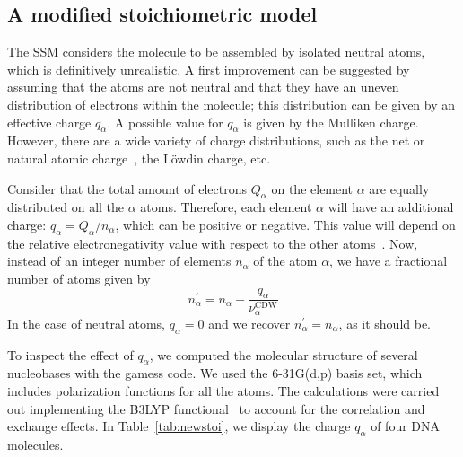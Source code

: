 \documentclass[preprint,12pt]{article}
\begin{document}
\subsection{A modified stoichiometric model}

The SSM considers the molecule to be assembled by isolated neutral atoms, 
which is definitively unrealistic. A first improvement can be suggested 
by assuming that the atoms are not neutral and that they have an uneven
distribution of electrons within the molecule; this distribution can be
given by an effective charge $q_{\alpha}$. A possible value for 
$q_{\alpha}$ is given by the Mulliken charge. However, there are a wide
variety of charge distributions, such as the net or natural atomic
charge~\cite{lee2003}, the L\"owdin charge, etc.

Consider that the total amount of electrons $Q_{\alpha }$ on the element
$\alpha$ are equally distributed on all the $\alpha$ atoms. Therefore, 
each element $\alpha$ will have an additional charge: 
$q_{\alpha}=Q_{\alpha}/n_{\alpha}$, which can be positive or negative.
This value will depend on the relative electronegativity value with 
respect to the other atoms~\cite{rappe1991}. Now, instead of an
integer number of elements $n_{\alpha}$ of the atom $\alpha$, we have a 
fractional number of atoms given by 
\begin{equation}
n_{\alpha }^{\prime }=n_{\alpha }-
\frac{q_{\alpha }}{\nu_{\alpha }^{\text{CDW}}}
\label{eq:newstoi}
\end{equation}%
In the case of neutral atoms, $q_{\alpha}=0$ and we recover 
$n_{\alpha}^{\prime}=n_{\alpha}$, as it should be.

To inspect the effect of $q_{\alpha}$, we computed the molecular
structure of several nucleobases with the {\sc gamess} code. We 
used the 6-31G(d,p) basis set, which includes polarization 
functions for all the atoms. The calculations were carried out 
implementing the B3LYP functional~\cite{Becke1993,Stephens1994} to 
account for the correlation and exchange effects. 
In Table~\ref{tab:newstoi}, we display the charge $q_{\alpha}$ of four 
DNA molecules. 
\end{document}
